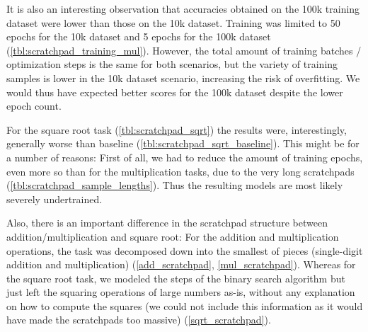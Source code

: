 It is also an interesting observation that accuracies obtained on the 100k training dataset were lower than those on the 10k dataset. Training was limited to 50 epochs for the 10k dataset and 5 epochs for the 100k dataset (\cref{tbl:scratchpad_training_mul}). However, the total amount of training batches / optimization steps is the same for both scenarios, but the variety of training samples is lower in the 10k dataset scenario, increasing the risk of overfitting.
We would thus have expected better scores for the 100k dataset despite the lower epoch count.

\begin{table}[H]
	\begin{minipage}[t]{0.47\linewidth}
		\hfill
		\label{tbl:scratchpad_sqrt}
	\end{minipage}
	\hfill %
	\begin{minipage}[t]{0.47\linewidth}
		\hfill
		\label{tbl:scratchpad_sqrt_baseline}
	\end{minipage}
\end{table}

For the square root task (\cref{tbl:scratchpad_sqrt}) the results were, interestingly, generally worse than baseline (\cref{tbl:scratchpad_sqrt_baseline}). This might be for a number of reasons:
First of all, we had to reduce the amount of training epochs, even more so than for the multiplication tasks, due to the very long scratchpads (\cref{tbl:scratchpad_sample_lengths}). Thus the resulting models are most likely severely undertrained.

Also, there is an important difference in the scratchpad structure between addition/multiplication and square root: For the addition and multiplication operations, the task was decomposed down into the smallest of pieces (single-digit addition and multiplication) (\cref{add_scratchpad}, \cref{mul_scratchpad}). Whereas for the square root task, we modeled the steps of the binary search algorithm but just left the squaring operations of large numbers as-is, without any explanation on how to compute the squares (we could not include this information as it would have made the scratchpads too massive) (\cref{sqrt_scratchpad}).

